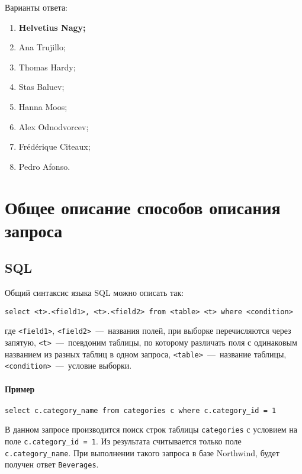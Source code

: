 \begin{appendices}
Варианты ответа:

\begin{enumerate}
	\item \textbf{Helvetius Nagy;}
	\item Ana Trujillo;
	\item Thomas Hardy;
	\item Stas Baluev;
	\item Hanna Moos;
	\item Alex Odnodvorcev;
	\item Frédérique Citeaux;
	\item Pedro Afonso.
\end{enumerate}


\chapter{Общее описание способов описания запроса}

\section{SQL}

Общий синтаксис языка SQL можно описать так:

\begin{lstlisting}[label=sql-syntax,caption=Синтаксис запроса выборки в SQL]
select <t>.<field1>, <t>.<field2> from <table> <t> where <condition>
\end{lstlisting}

\noindent где \texttt{<field1>}, \texttt{<field2>}~---~названия полей, при выборке перечисляются через запятую, \texttt{<t>}~---~псевдоним таблицы, по которому различать поля с одинаковым названием из разных таблиц в одном запроса, \texttt{<table>}~---~название таблицы, \texttt{<condition>}~---~условие выборки.

\subsubsection*{Пример}

\begin{lstlisting}[label=sql-syntax-ex-1,caption=Пример запроса на SQL]
select c.category_name from categories c where c.category_id = 1
\end{lstlisting}

В данном запросе производится поиск строк таблицы \texttt{categories} с условием на поле \texttt{c.category\_id = 1}. Из результата считывается только поле \texttt{c.category\_name}. При выполнении такого запроса в базе Northwind, будет получен ответ \texttt{Beverages}.


\end{appendices}

